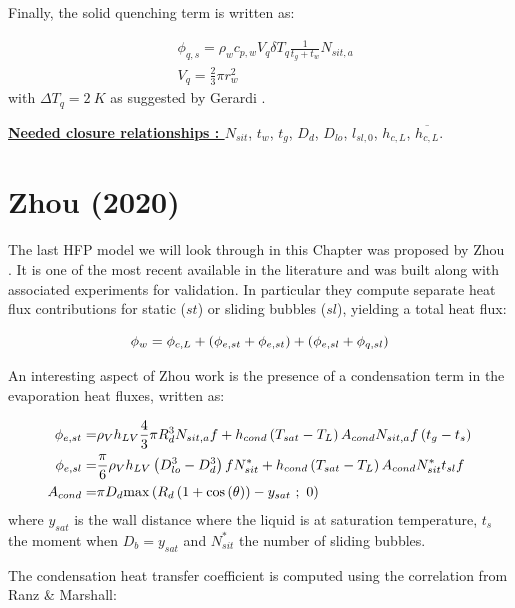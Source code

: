 Finally, the solid quenching term is written as:

\begin{align}
& \phi_{q,s} = \rho_{w} c_{p,w} V_{q} \delta T_{q} \frac{1}{t_{g}+t_{w}} N_{sit,a}\\
%
& V_{q} = \frac{2}{3} \pi r_{w}^{2}
\end{align}
with $\Delta T_{q}=2\ K$ as suggested by Gerardi \etal \cite{gerardi_etal}.

\npar

\textbf{\underline{Needed closure relationships : }} $N_{sit}$, $t_{w}$, $t_{g}$, $D_{d}$, $D_{lo}$, $l_{sl,0}$, $h_{c,L}$, $\overline{h_{c,L}}$. 



\section{Zhou (2020)}

The last HFP model we will look through in this Chapter was proposed by Zhou \etal \cite{zhou}. It is one of the most recent available in the literature and was built along with associated experiments for validation. In particular they compute separate heat flux contributions for static ($st$) or sliding bubbles ($sl$), yielding a total heat flux:

\begin{equation}
\phi_{w} = \phi_{c,L} + \left( \phi_{e,st}+ \phi_{e,st} \right) + \left( \phi_{e,sl}+\phi_{q,sl} \right)
\end{equation}

An interesting aspect of Zhou \etal work is the presence of a condensation term in the evaporation heat fluxes, written as:

\begin{align}
\phi_{e,st} =& \rho_{V}h_{LV}\frac{4}{3}\pi R_{d}^{3} N_{sit,a} f  + h_{cond}\parth{T_{sat}-T_{L}}A_{cond} N_{sit,a} f \parth{t_{g}-t_{s}} \\
%
\phi_{e,sl} =& \frac{\pi}{6}\rho_{V}h_{LV}\parth{D_{lo}^{3}-D_{d}^{3}}fN_{sit}^{*} + h_{cond} \parth{T_{sat}-T_{L}}A_{cond}N_{sit}^{*}t_{sl}f\\
%
A_{cond} =& \pi D_{d} \mathrm{max}\parth{R_{d}\parth{1+\cos{\theta}}-y_{sat}\ ;\ 0}
\end{align}
where $y_{sat}$ is the wall distance where the liquid is at saturation temperature, $t_{s}$ the moment when $D_{b}=y_{sat}$ and $N_{sit}^{*}$ the number of sliding bubbles.

The condensation heat transfer coefficient is computed using the correlation from Ranz \& Marshall:


